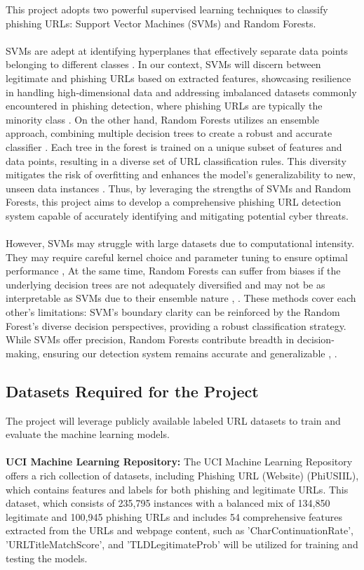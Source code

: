 \documentclass[11pt]{article}
\begin{document}
This project adopts two powerful supervised learning techniques to classify phishing URLs: Support Vector Machines (SVMs) and Random Forests.\\\\ SVMs are adept at identifying hyperplanes that effectively separate data points belonging to different classes \cite{aljofey2022effective}. In our context, SVMs will discern between legitimate and phishing URLs based on extracted features, showcasing resilience in handling high-dimensional data and addressing imbalanced datasets commonly encountered in phishing detection, where phishing URLs are typically the minority class \cite{sahingoz2019}. On the other hand, Random Forests utilizes an ensemble approach, combining multiple decision trees to create a robust and accurate classifier \cite{9277256}. Each tree in the forest is trained on a unique subset of features and data points, resulting in a diverse set of URL classification rules. This diversity mitigates the risk of overfitting and enhances the model's generalizability to new, unseen data instances \cite{9277256}. Thus, by leveraging the strengths of SVMs and Random Forests, this project aims to develop a comprehensive phishing URL detection system capable of accurately identifying and mitigating potential cyber threats. \\\\
However, SVMs may struggle with large datasets due to computational intensity. They may require careful kernel choice and parameter tuning to ensure optimal performance \cite{sahingoz2019}, \cite{aljofey2022effective} At the same time, Random Forests can suffer from biases if the underlying decision trees are not adequately diversified and may not be as interpretable as SVMs due to their ensemble nature \cite{9277256}, \cite{li2023survey}. These methods cover each other's limitations: SVM's boundary clarity can be reinforced by the Random Forest's diverse decision perspectives, providing a robust classification strategy. While SVMs offer precision, Random Forests contribute breadth in decision-making, ensuring our detection system remains accurate and generalizable \cite{9277256}, \cite{aljofey2022effective}.

\subsection{Datasets Required for the Project}

The project will leverage publicly available labeled URL datasets to train and evaluate the machine learning models.\\\\ \textbf{UCI Machine Learning Repository:} The UCI Machine Learning Repository offers a rich collection of datasets, including Phishing URL (Website) (PhiUSIIL), which contains features and labels for both phishing and legitimate URLs. This dataset, which consists of 235,795 instances with a balanced mix of 134,850 legitimate and 100,945 phishing URLs and includes 54 comprehensive features extracted from the URLs and webpage content, such as 'CharContinuationRate', 'URLTitleMatchScore', and 'TLDLegitimateProb' \cite{misc_phiusiil_phishing_url_(website)_967} will be utilized for training and testing the models.
\end{document}
